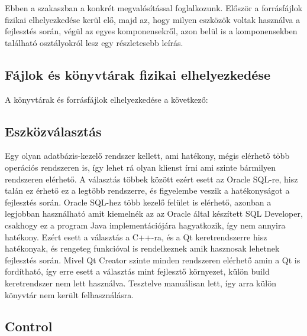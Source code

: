 Ebben a szakaszban a konkrét megvalósítással foglalkozunk. Először a forrásfájlok fizikai elhelyezkedése kerül elő, majd az, hogy milyen eszközök
voltak használva a fejlesztés során, végül az egyes komponensekről, azon belül is a komponensekben található osztályokról lesz egy részletesebb leírás.

\subsection{Fájlok és könyvtárak fizikai elhelyezkedése}

A könyvtárak és forrásfájlok elhelyezkedése a következő:

\subsection{Eszközválasztás}

Egy olyan adatbázis-kezelő rendszer kellett, ami hatékony, mégis elérhető több operációs
rendszeren is, így lehet rá olyan klienst írni ami szinte bármilyen rendszeren elérhető.
A választás többek között ezért esett az Oracle SQL-re, hisz talán ez érhető ez a legtöbb
rendszerre, és figyelembe veszik a hatékonyságot a fejlesztés során.
Oracle SQL-hez több kezelő felület is elérhető, azonban a legjobban használható amit kiemelnék az az Oracle által készített SQL Developer, csakhogy ez a program Java
implementációjára hagyatkozik, így nem annyira hatékony. Ezért esett a választás a C++-ra, és a Qt keretrendszerre
hisz hatékonyak, és rengeteg funkcióval is rendelkeznek amik hasznosak lehetnek fejlesztés
során. Mivel Qt Creator szinte minden rendszeren elérhető amin a Qt is fordítható, így erre esett
a választás mint fejlesztő környezet, külön build keretrendszer nem lett használva.
Tesztelve manuálisan lett, így arra külön könyvtár nem került felhasználásra.

\subsection{Control}

